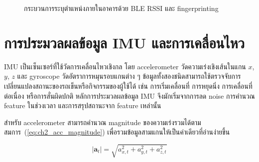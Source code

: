 \begin{figure}[htbp]
    \centering
    \caption{กระบวนการระบุตำแหน่งภายในอาคารด้วย BLE RSSI และ fingerprinting}
    \label{fig:ch2_ble_fingerprinting_pipeline}
\end{figure}

\section{การประมวลผลข้อมูล IMU และการเคลื่อนไหว}
\label{sec:ch2_imu_processing}

IMU เป็นเซ็นเซอร์ที่ใช้วัดการเคลื่อนไหวเชิงกล โดย accelerometer วัดความเร่งเชิงเส้นในแกน $x$, $y$, $z$ และ gyroscope วัดอัตราการหมุนรอบแกนต่าง ๆ ข้อมูลทั้งสองชนิดสามารถใช้ตรวจจับการเปลี่ยนแปลงสถานะของรถเข็นหรือกิจกรรมของผู้ใช้ได้ เช่น การเริ่มเคลื่อนที่ การหยุดนิ่ง การเคลื่อนที่ต่อเนื่อง หรือการสั่นผิดปกติ หลักการประมวลผลข้อมูล IMU จึงมักเริ่มจากการลด noise การคำนวณ feature ในช่วงเวลา และการสรุปสถานะจาก feature เหล่านั้น \cite{Lara2013WearableHAR}

สำหรับ accelerometer สามารถคำนวณ magnitude ของความเร่งรวมได้ตามสมการ~(\ref{eq:ch2_acc_magnitude}) เพื่อรวมข้อมูลสามแกนให้เป็นค่าเดียวที่อ่านง่ายขึ้น

\begin{equation}
    |\mathbf{a}_t| = \sqrt{a_{x,t}^{2}+a_{y,t}^{2}+a_{z,t}^{2}}
    \label{eq:ch2_acc_magnitude}
\end{equation}

